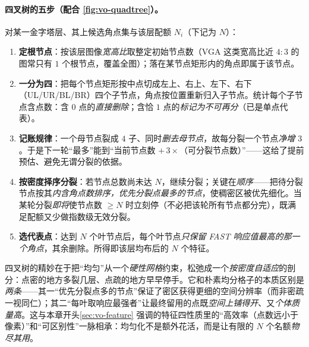 \paragraph{四叉树的五步\cite{murartal2017orbslam2}（配合 \cref{fig:vo-quadtree}）。}对某一金字塔层、其上候选角点集与该层配额 $N_i$（下记为 $N$）：
\begin{enumerate}
  \item \textbf{定根节点}：按该层图像\emph{宽高比}取整定初始节点数（VGA 这类宽高比近 $4{:}3$ 的图常只有 $1$ 个根节点，覆盖全图）；落在某节点矩形内的角点即属于该节点。
  \item \textbf{一分为四}：把每个节点矩形按中点切成左上、右上、左下、右下（UL/UR/BL/BR）四个子节点，角点按位置重新归入子节点。统计每个子节点含点数：含 $0$ 点的\emph{直接删除}；含恰 $1$ 点的\emph{标记为不可再分}（已是单点代表）。
  \item \textbf{记账规律}：一个母节点裂成 $4$ 子、同时\emph{删去母节点}，故每分裂一个节点\emph{净增 $3$}。于是下一轮“最多”能到“当前节点数 $+\,3\times$（可分裂节点数）”——这给了提前预估、避免无谓分裂的依据。
  \item \textbf{按密度择序分裂}：若节点总数尚未达 $N$，继续分裂；关键在\emph{顺序}——把待分裂节点按其\emph{内含角点数排序，优先分裂点最多的节点}，使稠密区被优先细化。当某轮分裂\emph{即将}使节点数 $\ge N$ 时立刻停（不必把该轮所有节点都分完），既满足配额又少做指数级无效分裂。
  \item \textbf{选代表点}：达到 $N$ 个叶节点后，每个叶节点\emph{只保留 FAST 响应值最高的那一个角点}，其余删除。所得即该层均布后的 $N$ 个特征。
\end{enumerate}

\begin{insight}
四叉树的精妙在于把“均匀”从一个\emph{硬性网格}约束，松弛成一个\emph{按密度自适应}的剖分：点密的地方多裂几层、点疏的地方早早停手。它和朴素均分格子的本质区别是\emph{两条}——其一“优先分裂点多的节点”保证了密区获得更细的空间分辨率（而非密疏一视同仁）；其二“每叶取响应最强者”让最终留用的点既\emph{空间上铺得开}、又\emph{个体质量高}。这与本章开头\cref{sec:vo-feature} 强调的特征四性质里的“高效率（点数远小于像素）”和“可区别性”一脉相承：均匀化不是额外花活，而是让有限的 $N$ 个名额\emph{物尽其用}。
\end{insight}

